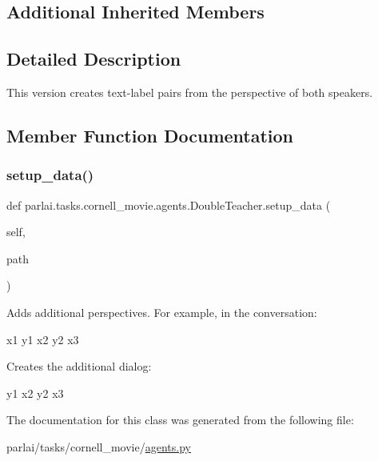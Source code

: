 \subsection*{Additional Inherited Members}


\subsection{Detailed Description}
\begin{DoxyVerb}This version creates text-label pairs from the perspective of both speakers.
\end{DoxyVerb}
 

\subsection{Member Function Documentation}
\mbox{\label{classparlai_1_1tasks_1_1cornell__movie_1_1agents_1_1DoubleTeacher_a329e24270a27f4c7d5b56d2b9c2aed8b}} 
\subsubsection{\texorpdfstring{setup\+\_\+data()}{setup\_data()}}
{\footnotesize\ttfamily def parlai.\+tasks.\+cornell\+\_\+movie.\+agents.\+Double\+Teacher.\+setup\+\_\+data (\begin{DoxyParamCaption}\item[{}]{self,  }\item[{}]{path }\end{DoxyParamCaption})}

\begin{DoxyVerb}Adds additional perspectives. For example, in the conversation:

x1 y1
x2 y2
x3

Creates the additional dialog:

y1 x2
y2 x3
\end{DoxyVerb}
 

The documentation for this class was generated from the following file\+:\begin{DoxyCompactItemize}
\item 
parlai/tasks/cornell\+\_\+movie/\hyperlink{parlai_2tasks_2cornell__movie_2agents_8py}{agents.\+py}\end{DoxyCompactItemize}
